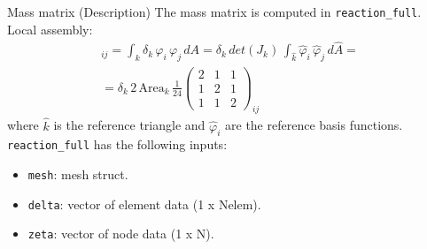 \documentclass[aspectratio=54,xcolor=dvipsnames]{beamer}
\begin{document}
\begin{frame}{Mass matrix (Description)}
    The mass matrix is computed in \texttt{reaction\_full}. \\
    Local assembly:
    \begin{align*}
        [B^{k}]_{ij}
        = \int_{k} \delta_{k}\,\varphi_i\,\varphi_j \,dA
        = \delta_{k}\,det(J_k)\,\int_{\hat{k}} \hat{\varphi}_i\,\hat{\varphi}_j \,d\hat{A} = \\
        = \delta_{k}\,2\,\mathrm{Area}_{k}\,\frac{1}{24}
          \begin{pmatrix}2&1&1\\1&2&1\\1&1&2\end{pmatrix}_{ij}
    \end{align*}
    where $\hat{k}$ is the reference triangle and $\hat{\varphi}_i$ are the reference basis functions. \\
    \texttt{reaction\_full} has the following inputs:
    \begin{itemize}
        \item \texttt{mesh}: mesh struct.
        \item \texttt{delta}: vector of element data (1 x Nelem).
        \item \texttt{zeta}: vector of node data (1 x N).
    \end{itemize}
\end{frame}
\end{document}
